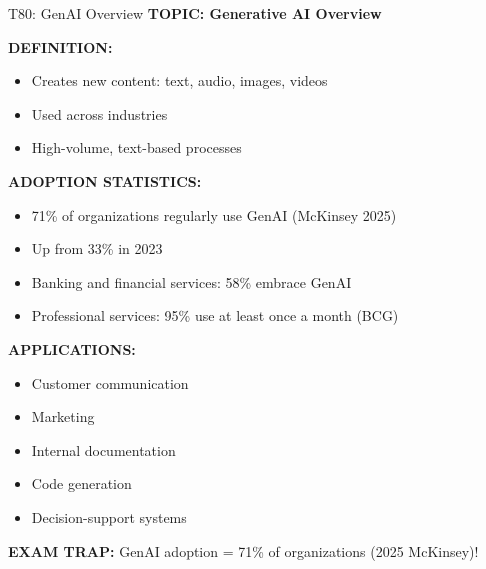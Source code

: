 \documentclass[8pt]{beamer}
\begin{document}
	\begin{frame}{T80: GenAI Overview}
		\fontsize{6.5}{7.5}\selectfont
		\textbf{TOPIC: Generative AI Overview}
		
		\vspace{0.1cm}
		\textbf{DEFINITION:}
		\begin{itemize}
			\item Creates new content: text, audio, images, videos
			\item Used across industries
			\item High-volume, text-based processes
		\end{itemize}
		
		\vspace{0.1cm}
		\textbf{ADOPTION STATISTICS:}
		\begin{itemize}
			\item 71\% of organizations regularly use GenAI (McKinsey 2025)
			\item Up from 33\% in 2023
			\item Banking and financial services: 58\% embrace GenAI
			\item Professional services: 95\% use at least once a month (BCG)
		\end{itemize}
		
		\vspace{0.1cm}
		\textbf{APPLICATIONS:}
		\begin{itemize}
			\item Customer communication
			\item Marketing
			\item Internal documentation
			\item Code generation
			\item Decision-support systems
		\end{itemize}
		
		\textcolor{myred}{\textbf{EXAM TRAP:}} GenAI adoption = \textcolor{myblue}{71\% of organizations} (2025 McKinsey)!
	\end{frame}
	
\end{document}
